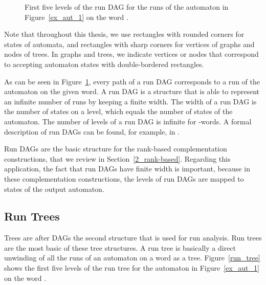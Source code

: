 \begin{figure}[htb]
\centering
\RunDAG
\caption{First five levels of the run DAG for the runs of the automaton in Figure~\ref{ex_aut_1} on the word \aom.}
\label{run_dag}
\end{figure}

Note that throughout this thesis, we use rectangles with rounded corners for states of automata, and rectangles with sharp corners for vertices of graphs and nodes of trees. In graphs and trees, we indicate vertices or nodes that correspond to accepting automaton states with double-bordered rectangles.

As can be seen in Figure~\ref{run_dag}, every path of a run DAG corresponds to a run of the automaton on the given word. A run DAG is a structure that is able to represent an infinite number of runs by keeping a finite width. The width of a run DAG is the number of states on a level, which equals the number of states of the automaton. The number of levels of a run DAG is infinite for \om-words. A formal description of run DAGs can be found, for example, in \cite{fogarty2013unifying}.

Run DAGs are the basic structure for the rank-based complementation constructions, that we review in Section~\ref{2_rank-based}. Regarding this application, the fact that run DAGs have finite width is important, because in these complementation constructions, the levels of run DAGs are mapped to states of the output automaton.

\subsection{Run Trees}
\label{2_run_trees}
Trees are after DAGs the second structure that is used for run analysis. Run trees are the most basic of these tree structures. A run tree is basically a direct unwinding of all the runs of an automaton on a word as a tree. Figure~\ref{run_tree} shows the first five levels of the run tree for the automaton in Figure~\ref{ex_aut_1} on the word \aom.




